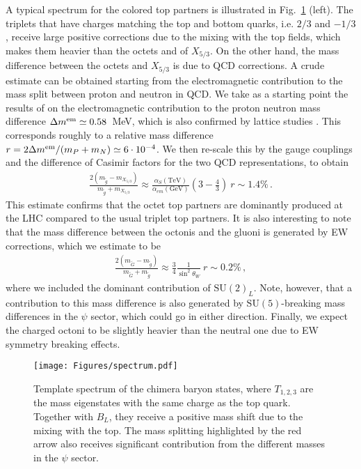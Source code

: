 \documentclass[preprintnumbers,nofootinbib,showpacs,eqsecnum,pre,12pt]{revtex4-1}
\newcommand{\SU}{\text{SU}}
\begin{document}
A typical spectrum for the colored top partners is illustrated in Fig.~\ref{fig:spectrum} (left). The triplets that have charges matching the top and bottom quarks, i.e. $2/3$ and $-1/3$, receive large positive corrections due to the mixing with the top fields, which makes them heavier than the octets and of $X_{5/3}$. On the other hand, the mass difference between the octets and $X_{5/3}$ is due to QCD corrections.
A crude estimate can be obtained starting from the electromagnetic contribution to the mass split between proton and neutron in QCD. We take as a starting point the results of \cite{Gasser:2020mzy} on the electromagnetic contribution to the proton neutron mass difference
$\Delta m^{\rm em} \simeq 0.58$~MeV, which is also confirmed by lattice studies \cite{Borsanyi:2014jba}.
This corresponds roughly to a relative mass difference
$r= 2 \Delta m^{\rm em}/(m_P+m_N) \simeq 6 \cdot 10^{-4}$.
We then re-scale this by the gauge couplings and the difference of Casimir factors for the two QCD representations, to obtain
\begin{align}
\frac{2 (m_{\tilde{g}} - m_{X_{5/3}})}{m_{\tilde{g}} + m_{X_{5/3}}} \approx \frac{\alpha_S (\text{TeV})}{\alpha_{em} (\text{GeV})} \left(3   -\frac{4}{3}\right)\ r \sim 1.4\%\,. 
\end{align}
This estimate confirms that the octet top partners are dominantly produced at the LHC compared to the usual triplet top partners. 
It is also interesting to note that the mass difference between the octonis and the gluoni is generated by EW corrections, which we estimate to be
\begin{align} \label{eq:weak_splitting}
\frac{2 (m_{\tilde{G}} - m_{\tilde{g}})}{m_{\tilde{G}} + m_{\tilde{g}}} \approx \frac{3}{4} \frac{1}{\sin^2 \theta_W} \ r \sim 0.2\%\,,
\end{align}
where we included the dominant contribution of $\SU(2)_L$. 
Note, however, that a contribution to this mass difference is also generated by $\SU(5)$-breaking mass differences in the $\psi$ sector, which could go in either direction.
Finally, we expect the charged octoni to be slightly heavier than the neutral one due to EW symmetry breaking effects. 



\begin{figure}[tb]
	\centering
	\texttt{[image: Figures/spectrum.pdf]}
	\caption{Template spectrum of the chimera baryon states, where $T_{1,2,3}$ are the mass eigenstates with the same charge as the top quark. Together with $B_L$, they receive a positive mass shift due to the mixing with the top. The mass splitting highlighted by the red arrow also receives significant contribution from the different masses in the $\psi$ sector.}
	\label{fig:spectrum}
\end{figure}
\end{document}
